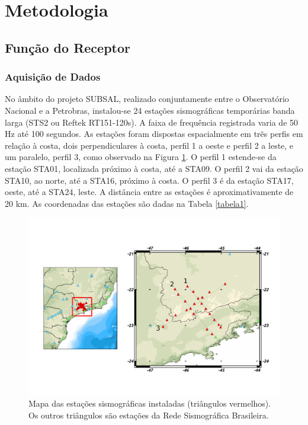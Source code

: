 \chapter*{Metodologia}

\section*{Função do Receptor}
\subsection*{Aquisição de Dados}

No âmbito do projeto SUBSAL, realizado conjuntamente entre o Observatório Nacional e a Petrobras,  instalou-se 24 estações sismográficas temporárias banda larga (STS2 ou Reftek RT151-120s). A faixa de frequência registrada varia de 50 Hz até 100 segundos.  As estações foram dispostas espacialmente em trẽs perfis em relação à costa, dois perpendiculares à costa, perfil 1 a oeste e perfil 2 a leste, e um paralelo, perfil 3, como observado na Figura \ref{figura1}. O perfil 1 estende-se da estação STA01, localizada próximo à costa, até a STA09. O perfil 2 vai da estação STA10, ao norte, até a STA16, próximo à costa. O perfil 3 é da estação STA17, oeste, até a STA24, leste. A distância entre as estações é aproximativamente de 20 km. As coordenadas das estações são dadas na Tabela \ref{tabela1}. 

\begin{figure}[!ht]
\centering
\includegraphics[scale=0.4]{mapa_das_estacoes_simosgraficas_instaladas.png}
\caption{Mapa das estações sismográficas instaladas (triângulos vermelhos). Os outros triângulos são estações da Rede Sismográfica Brasileira.}
\label{figura1}
\end{figure}

